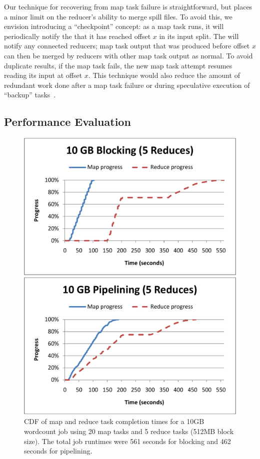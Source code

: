 Our technique for recovering from map task failure is straightforward, but
places a minor limit on the reducer's ability to merge spill files. To avoid
this, we envision introducing a ``checkpoint'' concept: as a map task runs, it
will periodically notify the {\JT} that it has reached offset $x$ in its input
split. The {\JT} will notify any connected reducers; map task output that was
produced before offset $x$ can then be merged by reducers with other map task
output as normal. To avoid duplicate results, if the map task fails, the new map
task attempt resumes reading its input at offset $x$. This technique would also
reduce the amount of redundant work done after a map task failure or during
speculative execution of ``backup'' tasks~\cite{mapreduce-osdi}.

\subsection{Performance Evaluation}
\label{ch:hop:sec:perf}

\begin{figure}[t]
\ssp
\begin{minipage}{0.5\linewidth}
  \centering
        \includegraphics[width=0.90\linewidth]{figures/wc_10gb_20m5r_blocking}
\end{minipage}
\begin{minipage}{0.5\linewidth}
  \centering
        \includegraphics[width=0.90\linewidth]{figures/wc_10gb_20m5r_pipeline}
\end{minipage}
\caption{CDF of map and reduce task completion times for a 10GB wordcount job
  using 20 map tasks and 5 reduce tasks (512MB block size). The total job
  runtimes were 561 seconds for blocking and 462 seconds for pipelining.}
\label{fig:wc1}
\end{figure}

